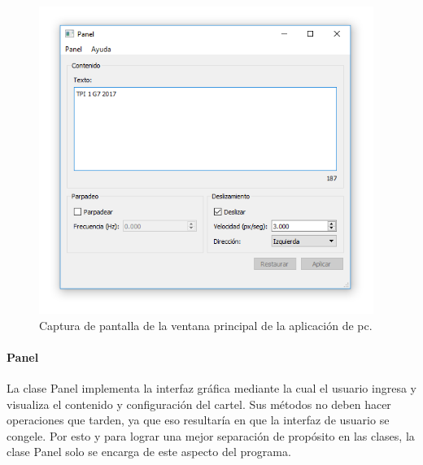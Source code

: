 \begin{figure}[!ht]
	\centering
	\includegraphics[height=10cm]{imagenes/panel-screenshot.png}
	\caption{Captura de pantalla de la ventana principal de la aplicación de pc.}
	\label{fig:panel-screenshot}
\end{figure}

\paragraph{Panel}
La clase Panel implementa la interfaz gráfica mediante la cual el usuario ingresa y visualiza el contenido y configuración del cartel. Sus métodos no deben hacer operaciones que tarden, ya que eso resultaría en que la interfaz de usuario se congele. Por esto y para lograr una mejor separación de propósito en las clases, la clase Panel solo se encarga de este aspecto del programa.

